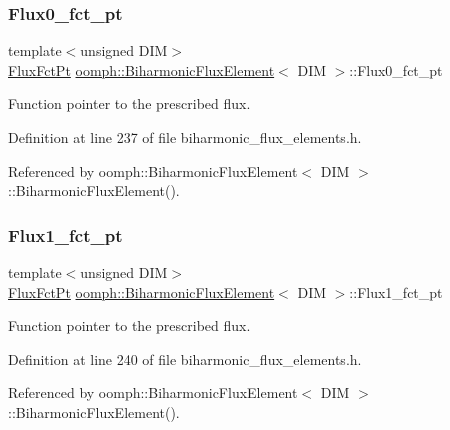 \subsubsection{\texorpdfstring{Flux0\+\_\+fct\+\_\+pt}{Flux0\_fct\_pt}}
{\footnotesize\ttfamily template$<$unsigned D\+IM$>$ \\
\hyperlink{classoomph_1_1BiharmonicFluxElement_a0fafeac48951b37cf5cd86aa486945a8}{Flux\+Fct\+Pt} \hyperlink{classoomph_1_1BiharmonicFluxElement}{oomph\+::\+Biharmonic\+Flux\+Element}$<$ D\+IM $>$\+::Flux0\+\_\+fct\+\_\+pt\hspace{0.3cm}{\ttfamily [private]}}



Function pointer to the prescribed flux. 



Definition at line 237 of file biharmonic\+\_\+flux\+\_\+elements.\+h.



Referenced by oomph\+::\+Biharmonic\+Flux\+Element$<$ D\+I\+M $>$\+::\+Biharmonic\+Flux\+Element().

\mbox{\label{classoomph_1_1BiharmonicFluxElement_a2b779a5523c39071099fe87f380ecdcb}} 
\subsubsection{\texorpdfstring{Flux1\+\_\+fct\+\_\+pt}{Flux1\_fct\_pt}}
{\footnotesize\ttfamily template$<$unsigned D\+IM$>$ \\
\hyperlink{classoomph_1_1BiharmonicFluxElement_a0fafeac48951b37cf5cd86aa486945a8}{Flux\+Fct\+Pt} \hyperlink{classoomph_1_1BiharmonicFluxElement}{oomph\+::\+Biharmonic\+Flux\+Element}$<$ D\+IM $>$\+::Flux1\+\_\+fct\+\_\+pt\hspace{0.3cm}{\ttfamily [private]}}



Function pointer to the prescribed flux. 



Definition at line 240 of file biharmonic\+\_\+flux\+\_\+elements.\+h.



Referenced by oomph\+::\+Biharmonic\+Flux\+Element$<$ D\+I\+M $>$\+::\+Biharmonic\+Flux\+Element().

